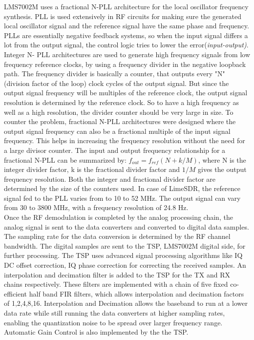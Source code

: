LMS7002M uses a fractional N-\ac{PLL} architecture for the local oscillator frequency synthesis.
\ac{PLL} is used extensively in \ac{RF} circuits for making sure the generated local oscillator signal and the reference signal have the same phase and frequency.
PLLs are essentially negative feedback systems, so when the input signal differs a lot from the output signal, the control logic tries to lower the error(\textit{input-output)}.
Integer N- \ac{PLL} architectures are used to generate high frequency signals from low frequency reference clocks, by using a frequency divider in the negative loopback path.
The frequency divider is basically a counter, that outputs every "N" (division factor of the loop) clock cycles of the output signal.
But since the output signal frequency will be multiples of the reference clock, the output signal resolution is determined by the  reference clock.
So to have a high frequency as well as a high resolution, the divider counter should be very large in size.
To counter the problem, fractional N-{PLL} architectures were designed where the output signal frequency can also be a fractional multiple of the input signal frequency.
This helps in increasing the frequency resolution without the need for a large divisor counter.
The input and output frequency relationship for a fractional  N-\ac{PLL} can be summarized by: $f_{out}=f_{ref}(N+k/M)$, where N is the integer divider factor, k is the fractional divider factor and $1/M$ gives the output frequency resolution.
Both the integer and fractional divider factor are determined by the size of the counters used.
In case of LimeSDR, the reference signal fed to the PLL varies from to 10 to 52 MHz.
The output signal can vary from 30 to 3800 MHz, with a frequency resolution of 24.8 Hz.\\

Once the \ac{RF} demodulation is completed by the analog processing chain, the analog signal is sent to the data converters and converted to digital data samples.
The sampling rate for the data conversion is determined by the \ac{RF} channel bandwidth.
The digital samples are sent to the \ac{TSP}, LMS7002M digital side, for further processing.
The \ac{TSP} uses advanced signal processing algorithms like IQ DC offset correction, IQ phase correction for correcting the received samples.
An interpolation and decimation filter is added to the \ac{TSP} for the TX and RX chains respectively.
These filters are implemented with a chain of five fixed co-efficient half band \ac{FIR} filters, which allows interpolation and decimation factors of 1,2,4,8,16.
Interpolation and Decimation allows the baseband to run at a lower data rate while still running the data converters at higher sampling rates, enabling the quantization noise to be spread over larger frequency range.
Automatic Gain Control is also implemented by the the \ac{TSP}.\\



